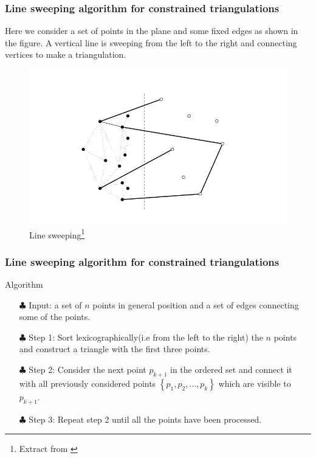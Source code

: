 \documentclass[10pt]{beamer}
\begin{document}
\begin{frame}
	\frametitle{Line sweeping algorithm for constrained triangulations}
	\vspace{.3cm}
	Here we consider a set of points in the plane and some fixed edges as shown in the figure. A vertical line is sweeping from the left to the right and connecting vertices to make a triangulation.
	\begin{figure}[H]
		\centering
		\includegraphics[scale=.25]{Line_sweeping}
		\caption[Line sweeping]{Line sweeping\footnote{Extract from \cite{edelsbrunner2001geometry}}}
		\label{fig:linesweeping}
	\end{figure}
\end{frame}
\begin{frame}
	\frametitle{Line sweeping algorithm for constrained triangulations}
\begin{block}{Algorithm}
	\begin{itemize}
		\item[$\clubsuit$] Input: a set of $n$ points in general position and a set of edges connecting some of the points. 
		\pause
		\item[$\clubsuit$] Step 1:  Sort lexicographically(i.e from the left to the right) the $n$ points and construct a triangle with the first three points.
		\pause
		\item[$\clubsuit$] Step 2: Consider the next point $p_{k+1}$ in the ordered set and connect it with all previously considered points $\left\{p_1,p_2,...,p_k\right\}$ which are visible to $p_{k+1}$.
		\pause
		\item[$\clubsuit$] Step 3: Repeat step 2 until all the points have been processed.
	\end{itemize}
\end{block}

\end{frame}
\end{document}
